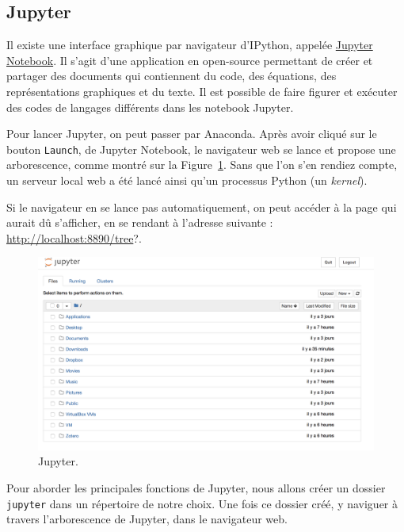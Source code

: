 \documentclass[12pt,]{book}
\numberwithin{equation}{section}
\numberwithin{countremarque}{section}
\begin{document}
\subsection{Jupyter}\label{jupyter}

Il existe une interface graphique par navigateur d'IPython, appelée
\href{http://jupyter.org/}{Jupyter Notebook}. Il s'agit d'une
application en open-source permettant de créer et partager des documents
qui contiennent du code, des équations, des représentations graphiques
et du texte. Il est possible de faire figurer et exécuter des codes de
langages différents dans les notebook Jupyter.

Pour lancer Jupyter, on peut passer par Anaconda. Après avoir cliqué sur
le bouton \texttt{Launch}, de Jupyter Notebook, le navigateur web se
lance et propose une arborescence, comme montré sur la
Figure~\ref{fig:intro-jupyter}. Sans que l'on s'en rendiez compte, un
serveur local web a été lancé ainsi qu'un processus Python (un
\emph{kernel}).

Si le navigateur en se lance pas automatiquement, on peut accéder à la
page qui aurait dû s'afficher, en se rendant à l'adresse suivante :
\url{http://localhost:8890/tree}?.

\begin{figure}[H]

{\centering \includegraphics[width=1\linewidth]{figs/jupyter} 

}

\caption{Jupyter.}\label{fig:intro-jupyter}
\end{figure}

Pour aborder les principales fonctions de Jupyter, nous allons créer un
dossier \texttt{jupyter} dans un répertoire de notre choix. Une fois ce
dossier créé, y naviguer à travers l'arborescence de Jupyter, dans le
navigateur web.
\end{document}
